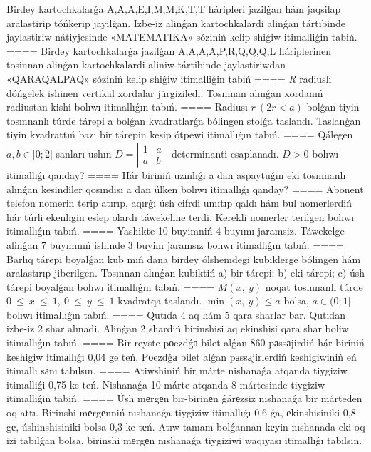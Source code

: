 Birdey kartochkalarǵa A,A,A,E,I,M,M,K,T,T háripleri jazilǵan hám jaqsilap aralastirip tóńkerip jayilǵan. Izbe-iz alinǵan kartochkalardi alinǵan tártibinde jaylastiriw nátiyjesinde «MATEMATIKA» sóziniń kelip shiǵiw itimalliǵin tabiń.
====
Birdey kartochkalarǵa jazilǵan A,A,A,A,P,R,Q,Q,Q,L háriplerinen tosinnan alinǵan kartochkalardi aliniw tártibinde jaylastiriwdan «QARAQALPAQ» sóziniń kelip shiǵiw itimalliǵin tabiń
====
\emph{R} radiuslı dóńgelek ishinen vertikal xordalar júrgiziledi. Tosınnan alınǵan xordanıń radiustan kishi bolıwı itimallıǵın tabıń.
====
Radiusı \(r\ (2r < a)\) bolǵan tiyin tosınnanlı túrde tárepi a bolǵan kvadratlarǵa bólingen stolǵa taslandı. Taslanǵan tiyin kvadrattıń bazı bir tárepin kesip ótpewi itimallıǵın tabıń.
====
Qálegen \(a,b \in \lbrack 0;2\rbrack\) sanları ushın \(D = \left| \begin{matrix}
1 & a \\
a & b
\end{matrix} \right|\) determinanti esaplanadı. \(D > 0\) bolıwı itimallıǵı qanday?
====
Hár biriniń uzınlıǵı a dan aspaytuǵın eki tosınnanlı alınǵan kesindiler qosındısı a dan úlken bolıwı itimallıǵı qanday?
====
Abonent telefon nomerin terip atırıp, aqırǵı úsh cifrdi umıtıp qaldı hám bul nomerlerdiń hár túrli ekenligin eslep olardı táwekeline terdi. Kerekli nomerler terilgen bolıwı itimallıǵın tabıń.
====
Yashikte 10 buyimniń 4 buyımı jaramsiz. Táwekelge alinǵan 7 buyımnıń ishinde 3 buyim jaramsız bolıwı itimallıǵın tabıń.
====
Barlıq tárepi boyalǵan kub mıń dana birdey ólshemdegi kubiklerge bólingen hám aralastırıp jiberilgen. Tosınnan alınǵan kubiktiń a) bir tárepi; b) eki tárepi; c) úsh tárepi boyalǵan bolıwı itimallıǵın tabıń.
====
\(M(x,\ y)\) noqat tosınnanlı túrde \(0\  \leq \ x\  \leq \ 1,\ 0\  \leq \ y\  \leq \ 1\) kvadratqa taslandı. \(\min(x,\ y) \leq a\) bolsa, \(a \in (0;1\rbrack\)bolıwı itimallıǵın tabıń.
====
Qutıda 4 aq hám 5 qara sharlar bar. Qutıdan izbe-iz 2 shar alınadi. Alinǵan 2 shardiń birinshisi aq ekinshisi qara shar boliw itimallıǵın tabıń.
====
Bir reyste pоezdǵа bilet alǵan 860 pаssаjirdiń hár biriniń keshigiw itimаllıǵı 0,04 ge teń. Pоezdǵа bilet alǵan pаssаjirlerdiń keshigiwiniń eń itimallı sаnı tabılsın.
====
Atiwshiniń bir márte nishanaǵa atqanda tiygiziw itimalliǵi 0,75 ke teń. Nishanaǵa 10 márte atqanda 8 mártesinde tiygiziw itimalliǵin tabiń.
====
Úsh mеrgеn bir-birinеn ǵárеzsiz nıshanaǵa bir márteden oq attı. Birinshi mеrgеnniń nıshanaǵa tiygiziw itimallıǵı 0,6 ǵa, еkinshisiniki 0,8 gе, úshinshisiniki bolsa 0,3 ke tеń. Atıw tamam bolǵannan kеyin nıshanada eki oq izi tabılǵan bolsa, birinshi mеrgеn nıshanaǵa tiygiziwi waqıyası itimallıǵı tabılsın.
